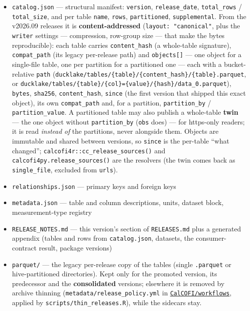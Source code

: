 \documentclass[
  letterpaper,
  DIV=11,
  numbers=noendperiod]{scrreprt}
\providecommand{\tightlist}{%
  \setlength{\itemsep}{0pt}\setlength{\parskip}{0pt}}
\begin{document}
\begin{itemize}
\tightlist
\item
  \texttt{catalog.json} --- structural manifest: \texttt{version},
  \texttt{release\_date}, \texttt{total\_rows} / \texttt{total\_size},
  and per table \texttt{name}, \texttt{rows}, \texttt{partitioned},
  \texttt{supplemental}. From the v2026.09 releases it is
  \textbf{content-addressed} (\texttt{layout:\ "canonical"}, plus the
  \texttt{writer} settings --- compression, row-group size --- that make
  the bytes reproducible): each table carries \texttt{content\_hash} (a
  whole-table signature), \texttt{compat\_path} (its legacy per-release
  path) and \texttt{objects{[}{]}} --- one object for a single-file
  table, one per partition for a partitioned one --- each with a
  bucket-relative \texttt{path}
  (\texttt{ducklake/tables/\{table\}/\{content\_hash\}/\{table\}.parquet},
  or
  \texttt{ducklake/tables/\{table\}/\{col\}=\{value\}/\{hash\}/data\_0.parquet}),
  \texttt{bytes}, \texttt{sha256}, \texttt{content\_hash},
  \texttt{since} (the first version that shipped this exact object), its
  own \texttt{compat\_path} and, for a partition, \texttt{partition\_by}
  / \texttt{partition\_value}. A partitioned table may also publish a
  whole-table \textbf{twin} --- the one object without
  \texttt{partition\_by} (\texttt{obs} does) --- for https-only readers;
  it is read \emph{instead of} the partitions, never alongside them.
  Objects are immutable and shared between versions, so \texttt{since}
  is the per-table ``what changed'';
  \texttt{calcofi4r::cc\_release\_sources()} and
  \texttt{calcofi4py.release\_sources()} are the resolvers (the twin
  comes back as \texttt{single\_file}, excluded from \texttt{urls}).
\item
  \texttt{relationships.json} --- primary keys and foreign keys
\item
  \texttt{metadata.json} --- table and column descriptions, units,
  dataset block, measurement-type registry
\item
  \texttt{RELEASE\_NOTES.md} --- this version's section of
  \texttt{RELEASES.md} plus a generated appendix (tables and rows from
  \texttt{catalog.json}, datasets, the consumer-contract result, package
  versions)
\item
  \texttt{parquet/} --- the legacy per-release copy of the tables
  (single \texttt{.parquet} or hive-partitioned directories). Kept only
  for the promoted version, its predecessor and the
  \textbf{consolidated} versions; elsewhere it is removed by archive
  thinning (\texttt{metadata/release\_policy.yml} in
  \href{https://github.com/CalCOFI/workflows}{\texttt{CalCOFI/workflows}},
  applied by \texttt{scripts/thin\_releases.R}), while the sidecars
  stay.
\end{itemize}
\end{document}
